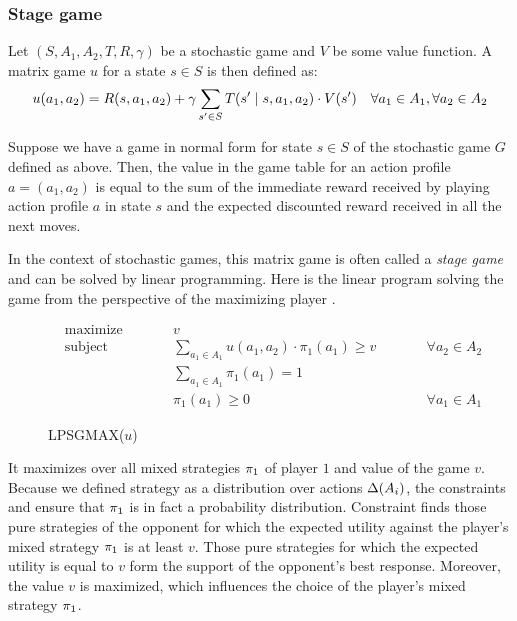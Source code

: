 \documentclass[../main.tex]{subfiles}
\begin{document}
\subsubsection{Stage game}\label{standard:sg:valueiter:stage}
\begin{definition}\label{standard:sg:valueiter:stage:matrix}
    Let $\left(S, A_1, A_2, T, R, \gamma\right)$ be a stochastic game and $V$ be some value function.
    A matrix game $u$ for a state $s \in S$ is then defined as:
    \begin{equation}
        u(a_1, a_2) = R(s, a_1, a_2) + \gamma \sum_{s^{\prime} \in S} T(s^{\prime} \mid s, a_1, a_2) \cdot V(s^{\prime}) \quad \forall a_1 \in A_1, \forall a_2 \in A_2
    \end{equation}
\end{definition}
Suppose we have a game in normal form for state $s \in S$ of the stochastic game $G$ defined as above.
Then, the value in the game table for an action profile $a = (a_1, a_2)$ is equal to the sum of the immediate reward received by playing action profile $a$ in state $s$ and the expected discounted reward received in all the next moves.

In the context of stochastic games, this matrix game is often called a \textit{stage game} and can be solved by linear programming.
Here is the linear program solving the game from the perspective of the maximizing player .
\begin{figure}[ht]
    \centering
    \begin{subequations}
        \begin{alignat}{3}
            & \text{maximize} & \qquad & v \\
            & \text{subject to} && \sum_{a_1 \in A_1} u(a_1, a_2) \cdot \pi_1(a_1) \geq v & \qquad & \forall a_2 \in A_2 \label{standard:sg:valueiter:stage:lpsgmax:c1} \\
            &&& \sum_{a_1 \in A_1} \pi_1(a_1) = 1 \label{standard:sg:valueiter:stage:lpsgmax:c2} \\
            &&& \pi_1(a_1) \geq 0 && \forall a_1 \in A_1 \label{standard:sg:valueiter:stage:lpsgmax:c3}
        \end{alignat}
    \end{subequations}
    \caption{LPSGMAX($u$)}
    \label{standard:sg:valueiter:stage:lpsgmax}
\end{figure}
It maximizes over all mixed strategies $\pi_{1}$ of player $1$ and value of the game $v$.
Because we defined strategy as a distribution over actions $\Delta(A_i)$, the constraints  and  ensure that $\pi_{1}$ is in fact a probability distribution.
Constraint  finds those pure strategies of the opponent for which the expected utility against the player's mixed strategy $\pi_{1}$ is at least $v$.
Those pure strategies for which the expected utility is equal to $v$ form the support of the opponent's best response.
Moreover, the value $v$ is maximized, which influences the choice of the player's mixed strategy $\pi_{1}$.
\end{document}
